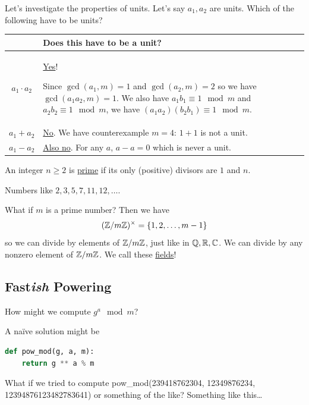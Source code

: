 Let's investigate the properties of units. Let's say $a_1, a_2$ are units. Which of the following have to be units?

\begin{table}[h]
    \centering
    \renewcommand\arraystretch{1.7}
    \begin{tabular}{c|l}
                       & Does this have to be a unit?                                                \\ \hline
        $a_1\cdot a_2$ & \begin{minipage}[t]{0.7\textwidth}
                             \ul{Yes}! \vspace{0.5em}

                             Since $\gcd(a_1, m) = 1$ and $\gcd(a_2, m) = 2$
                             so we have $\gcd(a_1a_2, m) = 1$. We also have $a_1b_1\equiv 1\mod m$
                             and $a_2b_2\equiv 1\mod m$,
                             we have $(a_1a_2)(b_2b_1)\equiv 1\mod m$.
                             \vspace{0.5em}
                         \end{minipage} \\ \hline
        $a_1 + a_2$    & \ul{No}. We have counterexample $m = 4$: $1 + 1$ is not a unit.             \\ \hline
        $a_1 - a_2$    & \ul{Also no}. For any $a$, $a - a = 0$ which is never a unit.
    \end{tabular}
    \renewcommand\arraystretch{1.05}
\end{table}

\begin{definition}
    An integer $n\geq 2$ is \ul{prime} if its only (positive) divisors are $1$ and $n$.
\end{definition}
\begin{example}
    Numbers like $2, 3, 5, 7, 11, 12, \dots$.
\end{example}

What if $m$ is a prime number? Then we have
\[(\mathbb Z/m\mathbb Z)^\times = \{1, 2, \dots, m-1\}\]
so we can divide by elements of $\mathbb Z/m\mathbb Z$, just like in $\mathbb Q, \mathbb R, \mathbb C$. We can divide by any nonzero element of $\mathbb Z/m\mathbb Z$. We call these \ul{fields}!

\subsection{Fast\emph{ish} Powering}
\begin{problem*}
    How might we compute $g^a\mod m$?
\end{problem*}
A na\"ive solution might be
\begin{lstlisting}[language=Python]
def pow_mod(g, a, m): 
    return g ** a % m
\end{lstlisting}
What if we tried to compute \textsf{pow\_mod(239418762304, 12349876234, 12394876123482783641)} or something of the like? Something like this\dots

